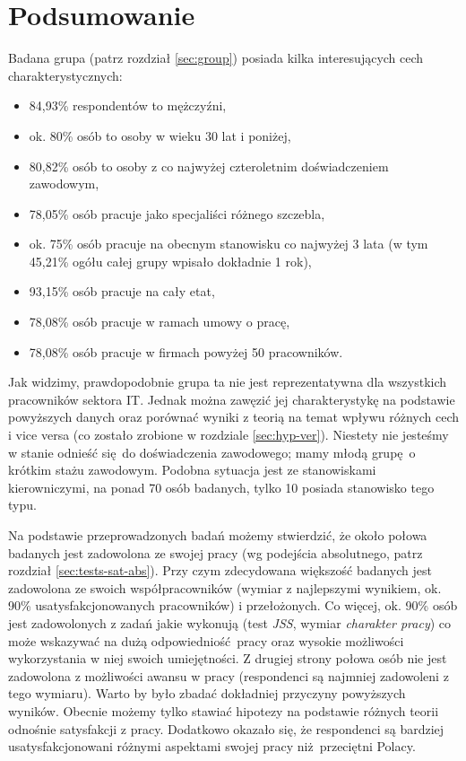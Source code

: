 \chapter{Podsumowanie}

Badana grupa (patrz rozdział \ref{sec:group}) posiada kilka interesujących cech charakterystycznych:
\begin{itemize}
  \item 84,93\% respondentów to mężczyźni,
  \item ok. 80\% osób to osoby w wieku 30 lat i poniżej,
  \item 80,82\% osób to osoby z co najwyżej czteroletnim doświadczeniem zawodowym,
  \item 78,05\% osób pracuje jako specjaliści różnego szczebla,
  \item ok. 75\% osób pracuje na obecnym stanowisku co najwyżej 3 lata (w tym 45,21\% ogółu całej grupy wpisało dokładnie 1 rok),
  \item 93,15\% osób pracuje na cały etat,
  \item 78,08\% osób pracuje w ramach umowy o pracę,
  \item 78,08\% osób pracuje w firmach powyżej 50 pracowników.
\end{itemize}
Jak widzimy, prawdopodobnie grupa ta nie jest reprezentatywna dla wszystkich pracowników sektora IT. Jednak można zawęzić jej charakterystykę na podstawie powyższych danych oraz porównać wyniki z teorią na temat wpływu różnych cech i vice versa (co zostało zrobione w rozdziale \ref{sec:hyp-ver}). Niestety nie jesteśmy w stanie odnieść się do doświadczenia zawodowego; mamy młodą grupę o krótkim stażu zawodowym. Podobna sytuacja jest ze stanowiskami kierowniczymi, na ponad 70 osób badanych, tylko 10 posiada stanowisko tego typu.

Na podstawie przeprowadzonych badań możemy stwierdzić, że około połowa badanych jest zadowolona ze swojej pracy (wg podejścia absolutnego, patrz rozdział \ref{sec:tests-sat-abs}). Przy czym zdecydowana większość badanych jest zadowolona ze swoich współpracowników (wymiar z najlepszymi wynikiem, ok. 90\% usatysfakcjonowanych pracowników) i przełożonych. Co więcej, ok. 90\% osób jest zadowolonych z zadań jakie wykonują (test \emph{JSS}, wymiar \textit{charakter pracy}) co może wskazywać na dużą odpowiedniość pracy oraz wysokie możliwości wykorzystania w niej swoich umiejętności. Z drugiej strony połowa osób nie jest zadowolona z możliwości awansu w pracy (respondenci są
najmniej zadowoleni z tego wymiaru). Warto by było zbadać dokładniej przyczyny powyższych wyników. Obecnie możemy tylko stawiać hipotezy na podstawie różnych teorii odnośnie satysfakcji z pracy.  Dodatkowo okazało się, że respondenci są bardziej usatysfakcjonowani różnymi aspektami swojej pracy niż przeciętni Polacy.

